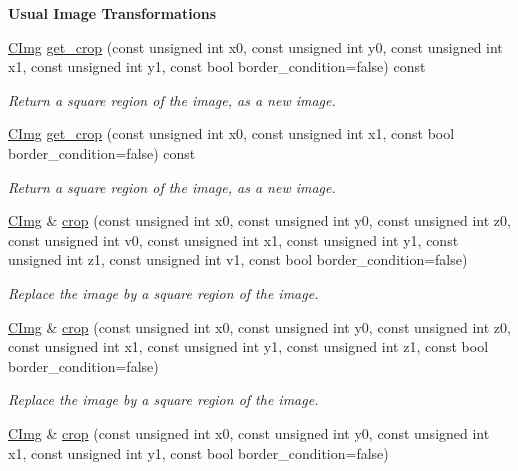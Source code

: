 \begin{Indent}{\bf Usual Image Transformations}
\begin{DoxyCompactItemize}
\hyperlink{structcimg__library_1_1_c_img}{CImg} \hyperlink{structcimg__library_1_1_c_img_af83cbce007c7cc4588bfdd8f4bdb8667}{get\_\-crop} (const unsigned int x0, const unsigned int y0, const unsigned int x1, const unsigned int y1, const bool border\_\-condition=false) const 
\begin{DoxyCompactList}\small\item\em Return a square region of the image, as a new image. \item\end{DoxyCompactList}\item 
\hyperlink{structcimg__library_1_1_c_img}{CImg} \hyperlink{structcimg__library_1_1_c_img_a35b3c1445d027e842ade7de3cf874556}{get\_\-crop} (const unsigned int x0, const unsigned int x1, const bool border\_\-condition=false) const 
\begin{DoxyCompactList}\small\item\em Return a square region of the image, as a new image. \item\end{DoxyCompactList}\item 
\hyperlink{structcimg__library_1_1_c_img}{CImg} \& \hyperlink{structcimg__library_1_1_c_img_a8a3fca195875af38971e6f9e1536e87e}{crop} (const unsigned int x0, const unsigned int y0, const unsigned int z0, const unsigned int v0, const unsigned int x1, const unsigned int y1, const unsigned int z1, const unsigned int v1, const bool border\_\-condition=false)
\begin{DoxyCompactList}\small\item\em Replace the image by a square region of the image. \item\end{DoxyCompactList}\item 
\hyperlink{structcimg__library_1_1_c_img}{CImg} \& \hyperlink{structcimg__library_1_1_c_img_a12a8b838b51df9cd53b4bf99fbd09fd2}{crop} (const unsigned int x0, const unsigned int y0, const unsigned int z0, const unsigned int x1, const unsigned int y1, const unsigned int z1, const bool border\_\-condition=false)
\begin{DoxyCompactList}\small\item\em Replace the image by a square region of the image. \item\end{DoxyCompactList}\item 
\hyperlink{structcimg__library_1_1_c_img}{CImg} \& \hyperlink{structcimg__library_1_1_c_img_a4fdfbde0b73a099246ce989dc36035d6}{crop} (const unsigned int x0, const unsigned int y0, const unsigned int x1, const unsigned int y1, const bool border\_\-condition=false)

\end{DoxyCompactItemize}
\end{Indent}
